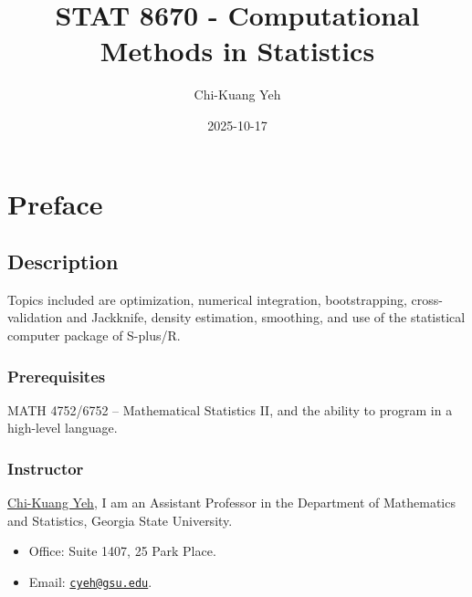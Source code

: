 \documentclass[
  letterpaper,
  DIV=11,
  numbers=noendperiod]{scrreprt}
\title{STAT 8670 - Computational Methods in Statistics}
\author{Chi-Kuang Yeh}
\date{2025-10-17}
\providecommand{\tightlist}{%
  \setlength{\itemsep}{0pt}\setlength{\parskip}{0pt}}
\renewcommand*\contentsname{Table of contents}
\newcommand\contentsname{Table of contents}
\begin{document}
\maketitle

\renewcommand*\contentsname{Table of contents}
{
\hypersetup{linkcolor=}
\setcounter{tocdepth}{2}
\tableofcontents
}


\chapter*{Preface}\label{preface}


\section*{Description}\label{description}


Topics included are optimization, numerical integration, bootstrapping,
cross-validation and Jackknife, density estimation, smoothing, and use
of the statistical computer package of S-plus/R.

\subsection*{Prerequisites}\label{prerequisites}

MATH 4752/6752 -- Mathematical Statistics II, and the ability to program
in a high-level language.

\subsection*{Instructor}\label{instructor}

\href{https://chikuang.github.io/}{Chi-Kuang Yeh}, I am an Assistant
Professor in the Department of Mathematics and Statistics, Georgia State
University.

\begin{itemize}
\tightlist
\item
  Office: Suite 1407, 25 Park Place.
\item
  Email: \href{mailto:cyeh@gsu.edu}{\nolinkurl{cyeh@gsu.edu}}.
\end{itemize}
\end{document}
